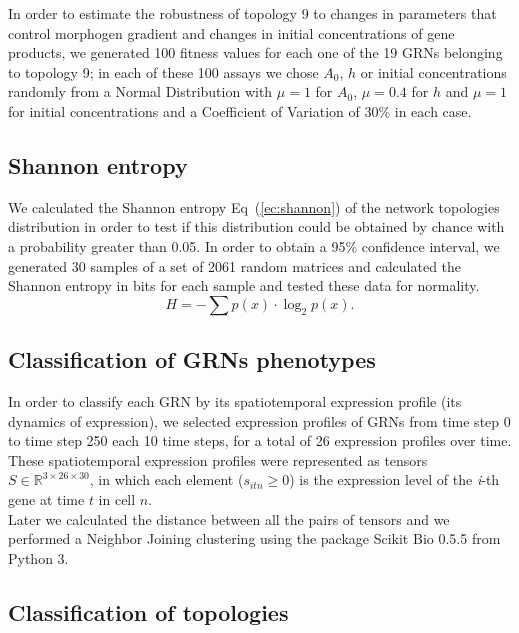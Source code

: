 \documentclass[10pt,letterpaper]{article}
\begin{document}
In order to estimate the robustness of topology 9 to changes in parameters that
control morphogen gradient and changes in initial concentrations of gene
products, we generated 100 fitness values for each one of the 19 GRNs
belonging to topology 9; in each of these 100 assays we chose $A_0$, $h$ or
initial concentrations randomly from a Normal Distribution with $\mu = 1$ for
$A_0$, $\mu = 0.4$ for $h$ and $\mu = 1$ for initial concentrations and a
Coefficient of Variation of 30\% in each case.

\subsection*{Shannon entropy}

We calculated the Shannon entropy Eq~(\ref{ec:shannon}) of the network
topologies distribution in order to test if this distribution could be obtained
by chance with a probability greater than 0.05. In order to obtain a 95\%
confidence interval, we generated 30 samples of a set of 2061 random matrices
and calculated the Shannon entropy in bits for each sample and tested these data
for normality.
\begin{equation}
 H = -\sum p(x) \cdot \log_{2}p(x).
 \label{ec:shannon}
\end{equation}

\subsection*{Classification of GRNs phenotypes}

In order to classify each GRN by its spatiotemporal expression profile (its
dynamics of expression), we selected expression profiles of GRNs from time step
0 to time step 250 each 10 time steps, for a total of 26 expression profiles
over time. These spatiotemporal expression profiles were represented as tensors
$S \in \mathbb{R}^{3 \times 26 \times 30}$, in which each element ($s_{itn} \geq
0$) is the expression level of the \emph{i}-th gene at time $t$ in cell $n$.\\

Later we calculated the distance between all the pairs of tensors and we
performed a Neighbor Joining clustering using the package Scikit Bio 0.5.5 from
Python 3.

\subsection*{Classification of topologies}
\end{document}
